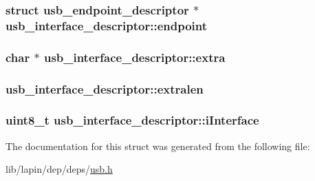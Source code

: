 \hypertarget{structusb__interface__descriptor_ac93862acb4427d16b1825734c474aeaa}{
\subsubsection[{endpoint}]{\setlength{\rightskip}{0pt plus 5cm}struct {\bf usb\-\_\-endpoint\-\_\-descriptor} $\ast$ usb\-\_\-interface\-\_\-descriptor\-::endpoint}}\label{structusb__interface__descriptor_ac93862acb4427d16b1825734c474aeaa}
\hypertarget{structusb__interface__descriptor_a3f091168899d53afd7669306893b5735}{
\subsubsection[{extra}]{ char $\ast$ usb\-\_\-interface\-\_\-descriptor\-::extra}}\label{structusb__interface__descriptor_a3f091168899d53afd7669306893b5735}
\hypertarget{structusb__interface__descriptor_ac0a7dff17ffc27fbab51c6c3da13bc8b}{
\subsubsection[{extralen}]{ usb\-\_\-interface\-\_\-descriptor\-::extralen}}\label{structusb__interface__descriptor_ac0a7dff17ffc27fbab51c6c3da13bc8b}
\hypertarget{structusb__interface__descriptor_a63008abbea76cc397836554747386055}{
\subsubsection[{i\-Interface}]{\setlength{\rightskip}{0pt plus 5cm}uint8\-\_\-t usb\-\_\-interface\-\_\-descriptor\-::i\-Interface}}\label{structusb__interface__descriptor_a63008abbea76cc397836554747386055}


The documentation for this struct was generated from the following file\-:\begin{DoxyCompactItemize}
\item 
lib/lapin/dep/deps/\hyperlink{deps_2usb_8h}{usb.\-h}\end{DoxyCompactItemize}
